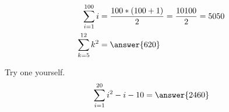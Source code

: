 \documentclass{ximera}
\begin{document}
\begin{example}\label{example:12-5}
\[
\begin{aligned}
\sum_{i=1}^{100} i & =\frac{100 *(100+1)}{2}=\frac{10100}{2}=5050 \\
\sum_{k=5}^{12} k^{2} & = \answer{620}
\end{aligned}
\]
\end{example}

\begin{exercise}\label{exercise:12-6}
Try one yourself.
\[
\sum_{i=1}^{20} i^{2}-i-10 = \answer{2460}
\]
\end{exercise}
\end{document}
